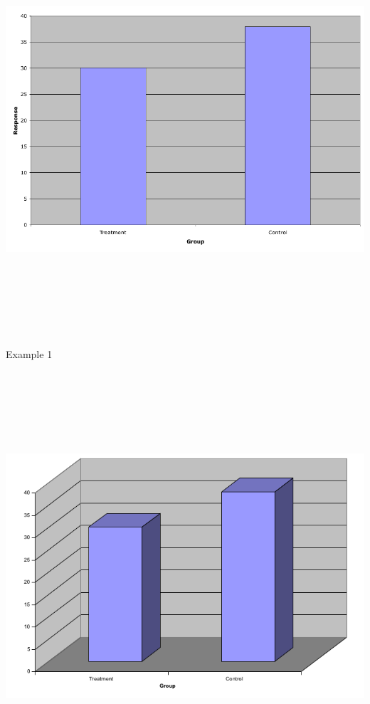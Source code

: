 \documentclass[12pt]{article}
\newcommand{\headsize}{\fontsize{35}{35} \selectfont}
\begin{document}
\centerline{\includegraphics[height=6in]{Figs/fig1d.png}}


\newpage


\headsize \color{myyellow}
\hfill \begin{minipage}{5.75in}
\centering
Example 1
\end{minipage}

\vspace{30mm}

\centerline{\includegraphics[height=6in]{Figs/fig1e.png}}
\end{document}
